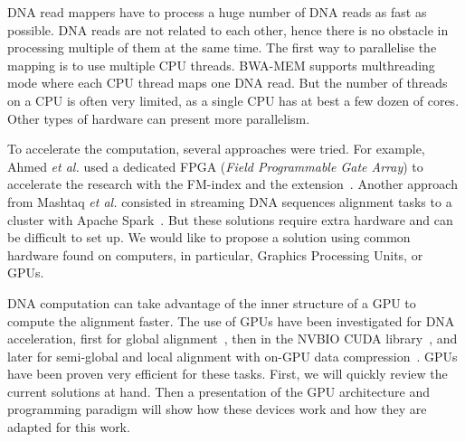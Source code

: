 DNA read mappers have to process a huge number of DNA reads as fast as possible. DNA reads are not related to each other, hence there is no obstacle in processing multiple of them at the same time. The first way to parallelise the mapping is to use multiple CPU threads. BWA-MEM supports multhreading mode where each CPU thread maps one DNA read. But the number of threads on a CPU is often very limited, as a single CPU has at best a few dozen of cores. Other types of hardware can present more parallelism.

To accelerate the computation, several approaches were tried. For example, Ahmed \emph{et al.} used a dedicated FPGA (\emph{Field Programmable Gate Array}) to accelerate the research with the FM-index and the extension~\cite{Ahmed:FPGA}. Another approach from Mashtaq \emph{et al.} consisted in streaming DNA sequences alignment tasks to a cluster with Apache Spark~\cite{Mushtaq:spark}. But these solutions require extra hardware and can be difficult to set up. We would like to propose a solution using common hardware found on computers, in particular, Graphics Processing Units, or GPUs.

DNA computation can take advantage of the inner structure of a GPU to compute the alignment faster. The use of GPUs have been investigated for DNA acceleration, first for global alignment~\cite{gpualignglobal}, then in the NVBIO CUDA library~\cite{nvidia:nvbio}, and later for semi-global and local alignment with on-GPU data compression~\cite{Ahmed:gasal}. GPUs have been proven very efficient for these tasks. First, we will quickly review the current solutions at hand. Then a presentation of the GPU architecture and programming paradigm will show how these devices work and how they are adapted for this work.


